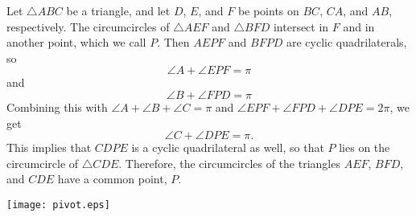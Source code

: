 \documentclass[12pt]{article}
\begin{document}
Let $\triangle ABC$ be a triangle, and let $D$, $E$, and $F$ be points
on $BC$, $CA$, and $AB$, respectively.  The circumcircles of
$\triangle AEF$ and $\triangle BFD$ intersect in $F$ and in another
point, which we call $P$.  Then $AEPF$ and $BFPD$ are cyclic
quadrilaterals, so
$$
\angle A+\angle EPF=\pi
$$
and
$$
\angle B+\angle FPD=\pi
$$
Combining this with $\angle A+\angle B+\angle C=\pi$ and $\angle
EPF+\angle FPD+\angle DPE=2\pi$, we get
$$
\angle C+\angle DPE=\pi.
$$
This implies that $CDPE$ is a cyclic quadrilateral as well, so that
$P$ lies on the circumcircle of $\triangle CDE$.  Therefore, the
circumcircles of the triangles $AEF$, $BFD$, and $CDE$ have a common
point, $P$.
\begin{center}
\texttt{[image: pivot.eps]}
\end{center}
\end{document}
